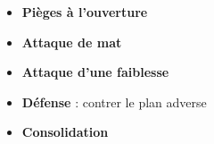\begin{itemize}[leftmargin=2.7cm, label=, itemsep=0pt]%
\item  {\bf Pièges à l'ouverture}
\item  {\bf Attaque de mat}
\item  {\bf Attaque d'une faiblesse}
\end{itemize}

\begin{itemize}[leftmargin=2.7cm, label=, itemsep=0pt]%
\item  {\bf Défense} : contrer le plan adverse
\item  {\bf Consolidation}
\end{itemize}



